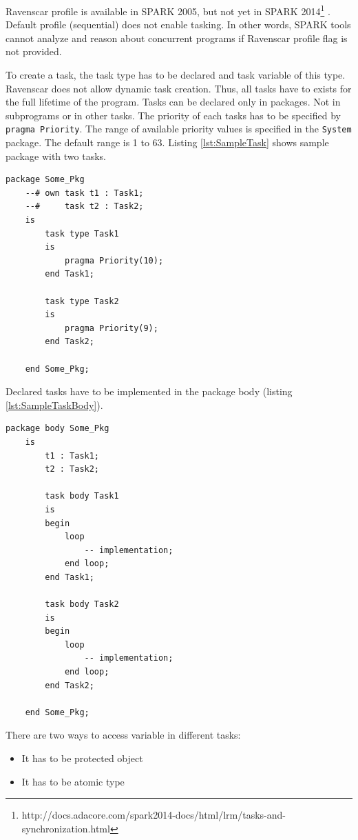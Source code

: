 Ravenscar profile is available in SPARK 2005, but not yet in SPARK 2014\footnote{http://docs.adacore.com/spark2014-docs/html/lrm/tasks-and-synchronization.html} \cite{Spark2014refManual:Online}. Default profile (sequential) does not enable tasking. In other words, SPARK tools cannot analyze and reason about concurrent programs if Ravenscar profile flag is not provided.

To create a task, the task type has to be declared and task variable of this type. Ravenscar does not allow dynamic task creation. Thus, all tasks have to exists for the full lifetime of the program. \cite{IssuesWithRavenscar:Paper} Tasks can be declared only in packages. Not in subprograms or in other tasks. \cite{Barnes:Book} The priority of each tasks has to be specified by \lstinline{pragma Priority}. The range of available priority values is specified in the \lstinline{System} package. The default range is 1 to 63. Listing \ref{lst:SampleTask} shows sample package with two tasks.

\singlespacing
\begin{lstlisting}[frame=single, gobble=0, caption={Sample tasks}, label={lst:SampleTask}]
	package Some_Pkg
	--# own task t1 : Task1;
	--#     task t2 : Task2;
	is
		task type Task1
		is
			pragma Priority(10);
		end Task1;

		task type Task2
		is
			pragma Priority(9);
		end Task2;

	end Some_Pkg;
\end{lstlisting} 
\doublespacing

Declared tasks have to be implemented in the package body (listing \ref{lst:SampleTaskBody}).

\singlespacing
\begin{lstlisting}[frame=single, gobble=0, caption={Sample tasks body}, label={lst:SampleTaskBody}]
	package body Some_Pkg
	is
		t1 : Task1;
		t2 : Task2;

		task body Task1
		is
		begin
			loop
				-- implementation;
			end loop;
		end Task1;

		task body Task2
		is
		begin
			loop
				-- implementation;
			end loop;
		end Task2;

	end Some_Pkg;
\end{lstlisting} 
\doublespacing

There are two ways to access variable in different tasks:
\begin{itemize}
    \item It has to be protected object
    \item It has to be atomic type
\end{itemize}

